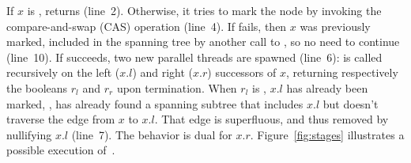 If $x$ is ,  returns 
(line~2). Otherwise, it tries to mark the node by invoking the
compare-and-swap (CAS) operation (line~4). If  fails, then
$x$ was previously marked, \ie included in the spanning tree by
another call to , so no need to continue (line~10). If
 succeeds, two new parallel threads are spawned (line~6):
 is called recursively on the left ($x.l$) and right
($x.r$) successors of $x$, returning respectively the booleans $r_l$
and $r_r$ upon termination. When $r_l$ is , $x.l$ has
already been marked, \ie,  has already found a spanning
subtree that includes $x.l$ but doesn't traverse the edge from $x$ to
$x.l$. That edge is superfluous, and thus removed by nullifying $x.l$
(line~7). The behavior is dual for $x.r$. Figure~\ref{fig:stages}
illustrates a possible execution of~.


